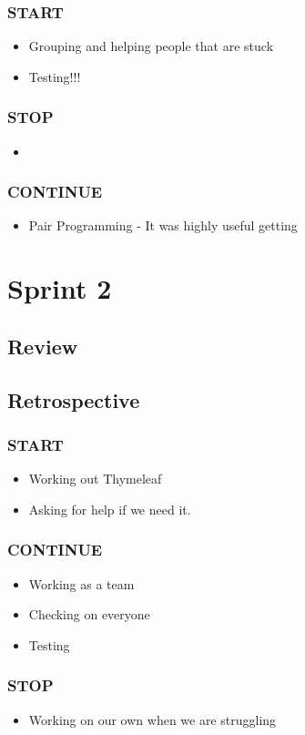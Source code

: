 \documentclass[]{report}
\begin{document}
			\subsection*{START}
				\begin{itemize}
					\item Grouping and helping people that are stuck
					\item Testing!!!
				\end{itemize}
				\subsection*{STOP}
				\begin{itemize}
					\item 
				\end{itemize}
				\subsection*{CONTINUE}
				\begin{itemize}
					\item Pair Programming - It was highly useful getting 
				\end{itemize}
	\chapter*{Sprint 2}
		\section*{Review}
		\section*{Retrospective}
			\subsection*{START}
				\begin{itemize}
					\item Working out Thymeleaf
					\item Asking for help if we need it.
				\end{itemize}
			\subsection*{CONTINUE}
				\begin{itemize}
					\item Working as a team
					\item Checking on everyone
					\item Testing
				\end{itemize}
			\subsection*{STOP}
				\begin{itemize}
					\item Working on our own when we are struggling
				\end{itemize}
\end{document}
